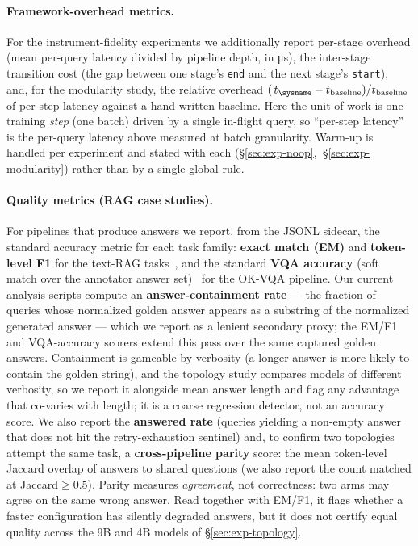 \paragraph{Framework-overhead metrics.} For the instrument-fidelity experiments
we additionally report per-stage overhead (mean per-query latency divided by
pipeline depth, in \si{\micro\second}), the inter-stage transition cost (the
gap between one stage's \texttt{end} and the next stage's \texttt{start}), and,
for the modularity study, the relative overhead
$(\,t_{\text{\sysname}} - t_{\text{baseline}})/t_{\text{baseline}}$ of per-step
latency against a hand-written baseline. Here the unit of work is one training
\emph{step} (one batch) driven by a single in-flight query, so ``per-step
latency'' is the per-query latency above measured at batch granularity. Warm-up
is handled per experiment and stated with each
(\S\ref{sec:exp-noop},~\S\ref{sec:exp-modularity}) rather than by a single
global rule.

\paragraph{Quality metrics (RAG case studies).} For pipelines that produce
answers we report, from the JSONL sidecar, the standard accuracy metric for each
task family: \textbf{exact match (EM)} and \textbf{token-level F1} for the
text-RAG tasks~\cite{rajpurkar2016squad,yang2018hotpotqa}, and the standard
\textbf{VQA accuracy} (soft match over the annotator answer
set)~\cite{antol2015vqa,goyal2017vqav2} for the OK-VQA pipeline. Our current
analysis scripts compute an \textbf{answer-containment rate} --- the fraction of
queries whose normalized golden answer appears as a substring of the normalized
generated answer --- which we report as a lenient secondary proxy; the EM/F1 and
VQA-accuracy scorers extend this pass over the same captured golden answers.
Containment is gameable by verbosity (a longer answer is more likely to contain
the golden string), and the topology study compares models of different
verbosity, so we report it alongside mean answer length and flag any advantage
that co-varies with length; it is a coarse regression detector, not an accuracy
score. We also report the \textbf{answered rate} (queries yielding a non-empty
answer that does not hit the retry-exhaustion sentinel) and, to confirm two
topologies attempt the same task, a \textbf{cross-pipeline parity} score: the
mean token-level Jaccard overlap of answers to shared questions (we also report
the count matched at Jaccard${\ge}0.5$). Parity measures \emph{agreement}, not
correctness: two arms may agree on the same wrong answer. Read together with
EM/F1, it flags whether a faster configuration has silently degraded answers,
but it does not certify equal quality across the 9B and 4B models of
\S\ref{sec:exp-topology}.


